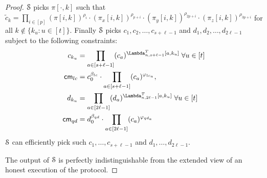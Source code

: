 \begin{proof}
	$\mathcal{S}$ picks $\pi[\cdot,k]$ such that 
	$\tilde{c}_k = \prod_{i\in[p]}(\pi[i,k])^{\rho_i}\cdot (\pi_x[i,k])^{\rho_{p+i}}\cdot(\pi_y[i,k])^{\rho_{2p+i}}\cdot (\pi_z[i,k])^{\rho_{3p+i}}$ for all $k\notin\{k_u:u\in[t]\}$.
	Finally $\mathcal{S}$ picks $c_1,c_2,\ldots, c_{s+\ell-1}$ and $d_1, d_2, \ldots, d_{2\ell-1}$ subject to the following constraints:
	\begin{align*}
	c_{k_u} &= \prod_{a\in[s+\ell-1]} (c_a)^{\Lambda_{n,s+\ell-1}^T[a,k_u]} \; \forall u\in[t]\\  
	\cm_{lc} &= c_0^{\beta_{lc}}\cdot\prod_{a\in[s+\ell-1]}(c_a)^{\varphi_{lc_a}}, \\
	d_{k_u} &= \prod_{a\in[2\ell-1]} (d_a)^{\Lambda_{n,2\ell-1}^T[a,k_u]} \; \forall u\in[t]\\
	\cm_{qd} &= d_0^{\beta_{qd}}\cdot\prod_{a\in[2\ell-1]}(c_a)^{\varphi_{qd_a}}
	\end{align*}
	$\mathcal{S}$ can efficiently pick such $c_1, \ldots, c_{s+\ell-1}$ and $d_1, \ldots, d_{2\ell-1}$. 
	
	The output of $\mathcal{S}$ is perfectly indistinguishable from the extended view of an honest execution of the protocol.
\end{proof}
